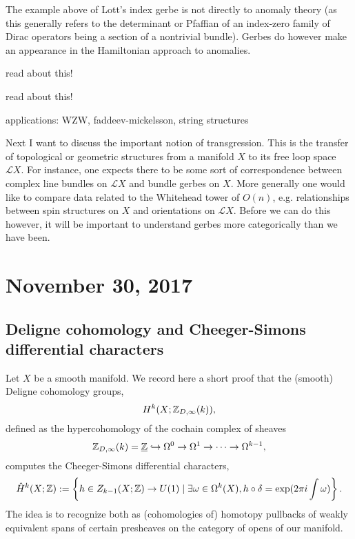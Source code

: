 \documentclass{amsart}
\begin{document}
The example above of Lott's index gerbe is not directly to anomaly theory
(as this generally refers to the determinant or Pfaffian of an index-zero family of Dirac
operators being a section of a nontrivial bundle). Gerbes do however make
an appearance in the Hamiltonian approach to anomalies.
\begin{example}
    {\color{red} read about this!}
\end{example}

\begin{example}
    {\color{red} read about this!}
\end{example}

applications: WZW, faddeev-mickelsson, string structures

Next I want to discuss the important notion of transgression. This is the
transfer of topological or geometric structures from a manifold $X$ to its
free loop space $\mathcal{L}X$. For instance, one expects there to be some
sort of correspondence between complex line bundles on $\mathcal{L}X$ and
bundle gerbes on $X$. 
More generally one would like to compare data related to the Whitehead tower
of $O(n)$, e.g. relationships between spin structures on $X$ and
orientations on $\mathcal{L}X$. Before we can do this however, it will be
important to understand gerbes more categorically than we have been.

\section{November 30, 2017}

\subsection{Deligne cohomology and Cheeger-Simons differential characters}

Let $X$ be a smooth manifold.
We record here a short proof that the (smooth) Deligne cohomology groups,
\begin{equation*}
    H^k(X;\mathbb{Z}_{D,\infty}(k)),
\end{equation*}
defined as the hypercohomology of the cochain complex of sheaves
\begin{equation*}
    \mathbb{Z}_{D,\infty}(k)=\underline{\mathbb{Z}}\hookrightarrow\Omega^0\to\Omega^1\to\cdots\to \Omega^{k-1},
\end{equation*}
computes the Cheeger-Simons differential characters,
\begin{equation*}
    \hat H^k(X;\mathbb{Z}) := \left\{h\in Z_{k-1}(X; \mathbb{Z})\to U(1) \mid \exists \omega\in\Omega^k(X), h\circ\delta=\exp(2\pi i\int\omega)\right\}.
\end{equation*}
The idea is to recognize both as (cohomologies of) homotopy pullbacks
of weakly equivalent spans of certain presheaves on the category of
opens of our manifold.
\end{document}
